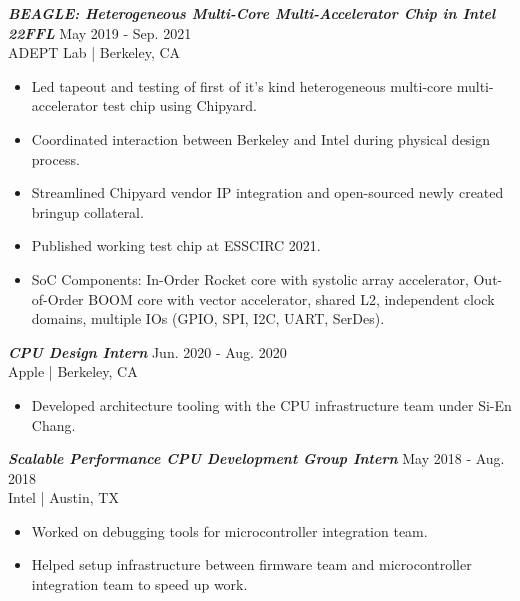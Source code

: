 \documentclass[letter]{res}
\begin{document}
\begin{resume}
{\sl \textbf{BEAGLE: Heterogeneous Multi-Core Multi-Accelerator Chip in Intel 22FFL}} \hfill May 2019 - Sep. 2021\\
ADEPT Lab | Berkeley, CA \newline

 \vspace{-4mm}

 \begin{itemize}
 \item Led tapeout and testing of first of it's kind heterogeneous multi-core multi-accelerator test chip using Chipyard.
 \item Coordinated interaction between Berkeley and Intel during physical design process.
 \item Streamlined Chipyard vendor IP integration and open-sourced newly created bringup collateral.
 \item Published working test chip at ESSCIRC 2021.
 \item SoC Components: In-Order Rocket core with systolic array accelerator, Out-of-Order BOOM core with vector accelerator, shared L2, independent clock domains, multiple IOs (GPIO, SPI, I2C, UART, SerDes).
 \end{itemize}

\vspace{-2mm}

{\sl \textbf{CPU Design Intern}} \hfill Jun. 2020 - Aug. 2020\\
Apple | Berkeley, CA \newline

 \vspace{-4mm}

 \begin{itemize}
 \item Developed architecture tooling with the CPU infrastructure team under Si-En Chang.
 \end{itemize}

\vspace{-2mm}

{\sl \textbf{Scalable Performance CPU Development Group Intern}} \hfill May 2018 - Aug. 2018\\
Intel | Austin, TX \newline

 \vspace{-4mm}

 \begin{itemize}
 \item Worked on debugging tools for microcontroller integration team.
 \item Helped setup infrastructure between firmware team and microcontroller integration team to speed up work.
 \end{itemize}


\end{resume}
\end{document}
